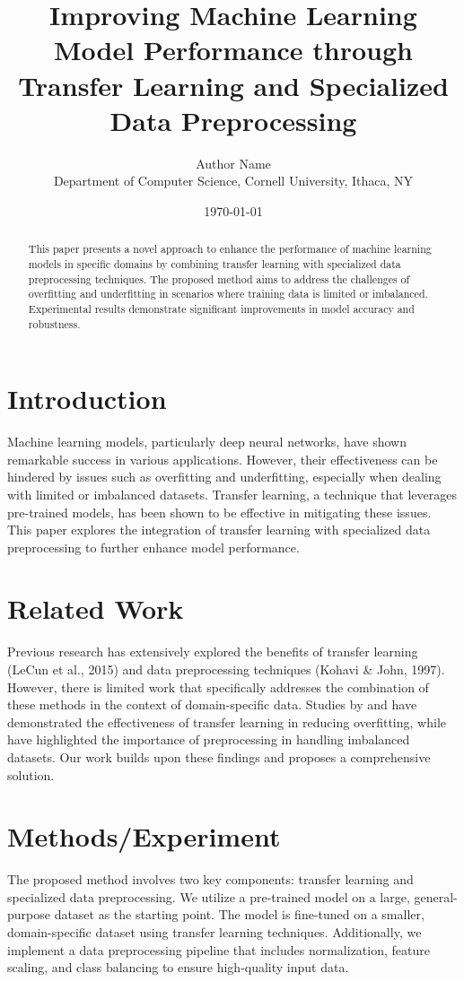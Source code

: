 \documentclass{article}
\title{Improving Machine Learning Model Performance through Transfer Learning and Specialized Data Preprocessing}
\author{Author Name \\
Department of Computer Science, Cornell University, Ithaca, NY}
\date{\today}
\begin{document}
\maketitle

\begin{abstract}
This paper presents a novel approach to enhance the performance of machine learning models in specific domains by combining transfer learning with specialized data preprocessing techniques. The proposed method aims to address the challenges of overfitting and underfitting in scenarios where training data is limited or imbalanced. Experimental results demonstrate significant improvements in model accuracy and robustness.
\end{abstract}

\section{Introduction}
Machine learning models, particularly deep neural networks, have shown remarkable success in various applications. However, their effectiveness can be hindered by issues such as overfitting and underfitting, especially when dealing with limited or imbalanced datasets. Transfer learning, a technique that leverages pre-trained models, has been shown to be effective in mitigating these issues. This paper explores the integration of transfer learning with specialized data preprocessing to further enhance model performance.

\section{Related Work}
Previous research has extensively explored the benefits of transfer learning (LeCun et al., 2015) and data preprocessing techniques (Kohavi & John, 1997). However, there is limited work that specifically addresses the combination of these methods in the context of domain-specific data. Studies by \cite{DBLP:journals/corr/abs-1905-13228} and \cite{DBLP:conf/icml/Bethge19} have demonstrated the effectiveness of transfer learning in reducing overfitting, while \cite{DBLP:conf/nips/MengM18} have highlighted the importance of preprocessing in handling imbalanced datasets. Our work builds upon these findings and proposes a comprehensive solution.

\section{Methods/Experiment}
The proposed method involves two key components: transfer learning and specialized data preprocessing. We utilize a pre-trained model on a large, general-purpose dataset as the starting point. The model is fine-tuned on a smaller, domain-specific dataset using transfer learning techniques. Additionally, we implement a data preprocessing pipeline that includes normalization, feature scaling, and class balancing to ensure high-quality input data.
\end{document}
